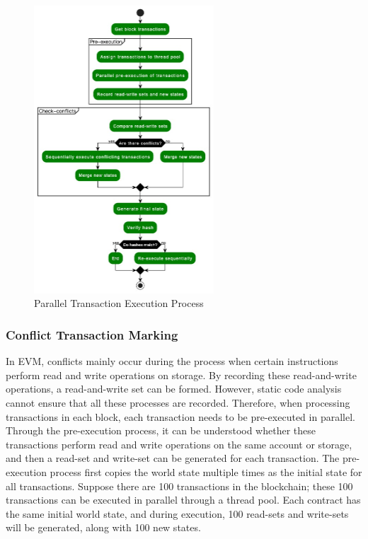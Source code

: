 \begin{figure}[!ht]
    \centering
    \includegraphics[width=0.6\textwidth]{images/paralle-execution.jpg}
    \caption{Parallel Transaction Execution Process}
    \label{fig:paralle-execution}
\end{figure}

\subsubsection{Conflict Transaction Marking}

In EVM, conflicts mainly occur during the process when certain instructions perform read and write operations on storage. By recording these read-and-write operations, a read-and-write set can be formed. However, static code analysis cannot ensure that all these processes are recorded. Therefore, when processing transactions in each block, each transaction needs to be pre-executed in parallel. Through the pre-execution process, it can be understood whether these transactions perform read and write operations on the same account or storage, and then a read-set and write-set can be generated for each transaction. The pre-execution process first copies the world state multiple times as the initial state for all transactions. Suppose there are 100 transactions in the blockchain; these 100 transactions can be executed in parallel through a thread pool. Each contract has the same initial world state, and during execution, 100 read-sets and write-sets will be generated, along with 100 new states.

